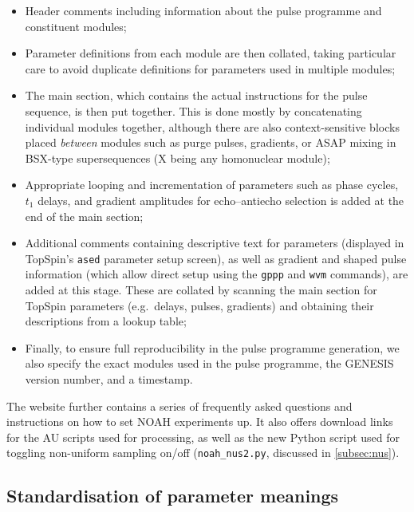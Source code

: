 \documentclass[a4paper,11pt]{article}
\begin{document}
\begin{refsection}
\begin{itemize}
    \item Header comments including information about the pulse programme and constituent modules;
    \item Parameter definitions from each module are then collated, taking particular care to avoid duplicate definitions for parameters used in multiple modules;
    \item The main section, which contains the actual instructions for the pulse sequence, is then put together.
        This is done mostly by concatenating individual modules together, although there are also context-sensitive blocks placed \textit{between} modules such as purge pulses, gradients, or ASAP mixing\autocite{Claridge2019MRC} in BSX-type supersequences (X being any homonuclear module);
    \item Appropriate looping and incrementation of parameters such as phase cycles, \(t_1\) delays, and gradient amplitudes for echo--antiecho selection is added at the end of the main section;
    \item Additional comments containing descriptive text for parameters (displayed in TopSpin's \texttt{ased} parameter setup screen), as well as gradient and shaped pulse information (which allow direct setup using the \texttt{gppp} and \texttt{wvm} commands), are added at this stage.
        These are collated by scanning the main section for TopSpin parameters (e.g.\ delays, pulses, gradients) and obtaining their descriptions from a lookup table;
    \item Finally, to ensure full reproducibility in the pulse programme generation, we also specify the exact modules used in the pulse programme, the GENESIS version number, and a timestamp.
\end{itemize}

The website further contains a series of frequently asked questions and instructions on how to set NOAH experiments up.
It also offers download links for the AU scripts used for processing, as well as the new Python script used for toggling non-uniform sampling on/off (\texttt{noah\_nus2.py}, discussed in \cref{subsec:nus}).

\subsection{Standardisation of parameter meanings}


\end{refsection}
\end{document}
